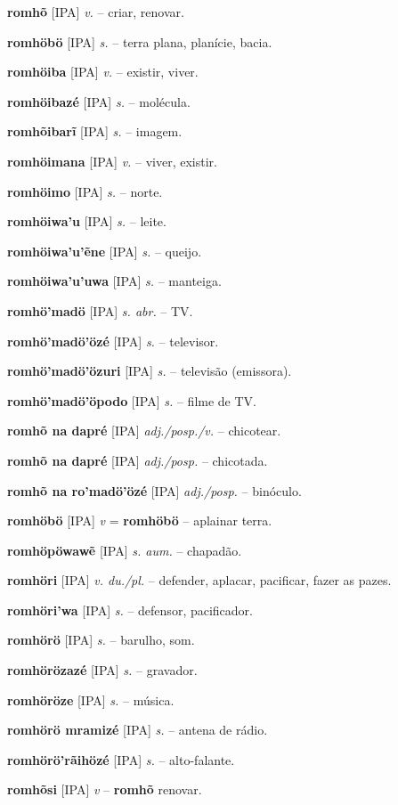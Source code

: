 \textbf{romhõ} [IPA] \textit{v.} -- criar, renovar.

\textbf{romhöbö} [IPA] \textit{s.} -- terra plana, planície, bacia.

\textbf{romhöiba} [IPA] \textit{v.} -- existir, viver.

\textbf{romhöibazé} [IPA] \textit{s.} -- molécula.

\textbf{romhõibarĩ} [IPA] \textit{s.} -- imagem.

\textbf{romhöimana} [IPA] \textit{v.} -- viver, existir.

\textbf{romhöimo} [IPA] \textit{s.} -- norte.

\textbf{romhöiwa'u} [IPA] \textit{s.} -- leite.

\textbf{romhöiwa'u'ẽne} [IPA] \textit{s.} -- queijo.

\textbf{romhöiwa'u'uwa} [IPA] \textit{s.} -- manteiga.

\textbf{romhö'madö} [IPA] \textit{s. abr.} -- TV.

\textbf{romhö'madö'özé} [IPA] \textit{s.} -- televisor.

\textbf{romhö'madö'özuri} [IPA] \textit{s.} -- televisão (emissora).

\textbf{romhö'madö'öpodo} [IPA] \textit{s.} -- filme de TV.

\textbf{romhõ na dapré} [IPA] \textit{adj./posp./v.} -- chicotear.

\textbf{romhõ na dapré} [IPA] \textit{adj./posp.} -- chicotada.

\textbf{romhõ na ro'madö'özé} [IPA] \textit{adj./posp.} -- binóculo.

\textbf{romhöbö} [IPA] \textit{v} = \textbf{romhöbö} -- aplainar terra.

\textbf{romhöpöwawẽ} [IPA] \textit{s. aum.} -- chapadão.

\textbf{romhöri} [IPA] \textit{v. du./pl.} -- defender, aplacar, pacificar, fazer as pazes.

\textbf{romhöri'wa} [IPA] \textit{s.} -- defensor, pacificador.

\textbf{romhörö} [IPA] \textit{s.} -- barulho, som.

\textbf{romhörözazé} [IPA] \textit{s.} -- gravador.

\textbf{romhöröze} [IPA] \textit{s.} -- música.

\textbf{romhörö mramizé} [IPA] \textit{s.} -- antena de rádio.

\textbf{romhörö'rãihözé} [IPA] \textit{s.} -- alto-falante.

\textbf{romhõsi} [IPA] \textit{v} -- \textbf{romhõ} renovar.

